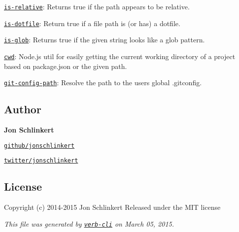 \begin{DoxyItemize}
\item \href{https://github.com/jonschlinkert/is-relative}{\tt is-\/relative}\+: Returns {\ttfamily true} if the path appears to be relative.
\item \href{https://github.com/regexps/is-dotfile}{\tt is-\/dotfile}\+: Return true if a file path is (or has) a dotfile.
\item \href{https://github.com/jonschlinkert/is-glob}{\tt is-\/glob}\+: Returns {\ttfamily true} if the given string looks like a glob pattern.
\item \href{https://github.com/jonschlinkert/cwd}{\tt cwd}\+: Node.\+js util for easily getting the current working directory of a project based on package.\+json or the given path.
\item \href{https://github.com/jonschlinkert/git-config-path}{\tt git-\/config-\/path}\+: Resolve the path to the user\textquotesingle{}s global .gitconfig.
\end{DoxyItemize}

\subsection*{Author}

{\bfseries Jon Schlinkert}


\begin{DoxyItemize}
\item \href{https://github.com/jonschlinkert}{\tt github/jonschlinkert}
\item \href{http://twitter.com/jonschlinkert}{\tt twitter/jonschlinkert}
\end{DoxyItemize}

\subsection*{License}

Copyright (c) 2014-\/2015 Jon Schlinkert Released under the M\+I\+T license





{\itshape This file was generated by \href{https://github.com/assemble/verb-cli}{\tt verb-\/cli} on March 05, 2015.} 
